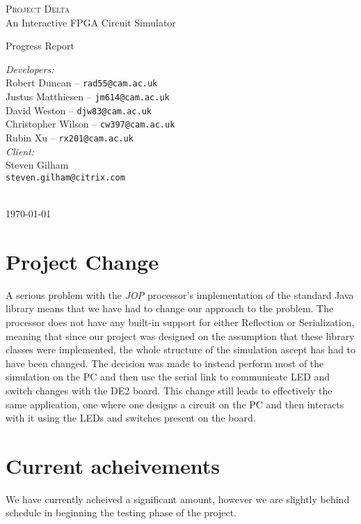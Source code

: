 \documentclass[12pt, a4paper, oneside,titlepage]{article}
\begin{document}
 \begin{titlepage}
 \begin{center}
 \textsc{\huge{Project Delta}} \\
 {\Large{An Interactive FPGA Circuit Simulator}}
\end{center}
\vspace{10em}
 \begin{center}
{\huge{Progress Report}}
\end{center}
\vfill
\setlength{\columnsep}{10em}
\begin{multicols}{2}{
\emph{Developers:}\\
Robert Duncan -- \texttt{rad55@cam.ac.uk} \\
Justus Matthiesen -- \texttt{jm614@cam.ac.uk}\\
David Weston -- \texttt{djw83@cam.ac.uk}\\
Christopher Wilson -- \texttt{cw397@cam.ac.uk}\\
Rubin Xu -- \texttt{rx201@cam.ac.uk}\\
\emph{Client:}\\
Steven Gilham\\
\texttt{steven.gilham@citrix.com}
\\
\\
}
\end{multicols}
\begin{center}
\today
\end{center}
 \end{titlepage}

\tableofcontents
\newpage
\setlength{\parskip}{\medskipamount}
\section{Project Change}
A serious problem with the \emph{JOP} processor's implementation of the standard Java library means that we have had to change our approach to the problem.
The processor does not have any built-in support for either Reflection or Serialization, meaning that since our project was designed on the assumption that 
these library classes were implemented, the whole structure of the simulation ascept has had to have been changed. The decision was made to instead perform
most of the simulation on the PC and then use the serial link to communicate LED and switch changes with the DE2 board. This change still leads to effectively
the same application, one where one designs a circuit on the PC and then interacts with it using the LEDs and switches present on the board. 
\section{Current acheivements}
We have currently acheived a significant amount, however we are slightly behind schedule in beginning the testing phase of the project. 
\end{document}
